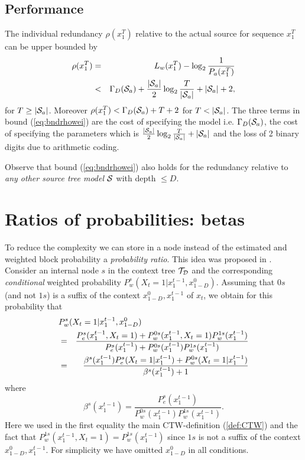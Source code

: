 \documentclass[10pt,conference]{IEEEtran}
\newcommand{\xpast}{x_{1-D}^{0}}
\newcommand{\xT}{x^{T}_{1}}
\newcommand{\xtm}{x^{t-1}_{1}}
\newcommand{\cS}{{\cal{S}}}
\newcommand{\cTD}{{\cal{T}_{D}}}
\newcommand{\GD}{{\Gamma_{D}}}
\begin{document}
\subsection{Performance}
The individual redundancy $\rho(\xT)$ relative to the actual source for sequence $\xT$ can be upper bounded by
\begin{eqnarray}
\rho(\xT)
&=&  L_w(\xT) - \log_2 \frac{1}{P_{a}(\xT)}  \nonumber \\
&<& \GD(\cS_a) + \frac{|\cS_a|}{2} \log_2 \frac{T}{|\cS_a|} +|\cS_a|+ 2, \label{eq:bndrhowei}
\end{eqnarray}
for $T\geq|\cS_a|$.
Moreover $\rho(\xT) < \GD(\cS_a)+T+2$ for $T<|\cS_a|$.
The three terms in bound (\ref{eq:bndrhowei}) are the cost of specifying the model i.e. $\GD(\cS_a)$, the cost of specifying the parameters which is $\frac{|\cS_a|}{2}\log_2 \frac{T}{|\cS_a|}+|\cS_a|$ and the loss of 2 binary digits due to arithmetic coding.

Observe that bound (\ref{eq:bndrhowei}) also holds for the redundancy relative to {\em any other source tree model $\cS$} with depth $\leq D$.


\section{Ratios of probabilities: betas}
To reduce the complexity we can store in a node instead of the estimated and weighted block probability a {\em probability ratio}.
This idea was proposed in \cite{WilTja98}.
Consider an internal node $s$ in the context tree $\cTD$ and the corresponding {\em conditional} weighted probability $P_{w}^{s}(X_{t}=1|\xtm,\xpast)$.
Assuming that $0s$ (and not $1s$) is a suffix of the context $\xpast,\xtm$ of $x_{t}$, we obtain for this probability that
\begin{eqnarray}
\label{eq:switch}
\lefteqn{ P_{w}^{s}(X_{t}=1|\xtm,\xpast) }  \nonumber \\
&=&\frac{ P_{e}^{s}(\xtm,X_{t}=1) + P_{w}^{0s}(\xtm,X_{t}=1) P_{w}^{1s}(\xtm) }
        { P_{e}^{s}(\xtm)         + P_{w}^{0s}(\xtm        ) P_{w}^{1s}(\xtm) }  \nonumber \\
&=&\frac{ \beta^{s}(\xtm) P_{e}^{s}(X_{t}=1|\xtm) + P_{w}^{0s}(X_{t}=1|\xtm) }
        { \beta^{s}(\xtm) + 1 }
\end{eqnarray}
where
\begin{equation}
\beta^{s}(\xtm)=\frac{ P_{e}^{s}(\xtm) }{ P_{w}^{0s}(\xtm)P_{w}^{1s}(\xtm) }.
\end{equation}
Here we used in the first equality the main CTW-definition (\ref{def:CTW}) and the fact that $P_{w}^{1s}(\xtm,X_{t}=1) = P_{w}^{1s}(\xtm)$ since $1s$ is not a suffix of the context $\xpast,\xtm$.
For simplicity we have omitted $\xpast$ in all conditions.
\end{document}

